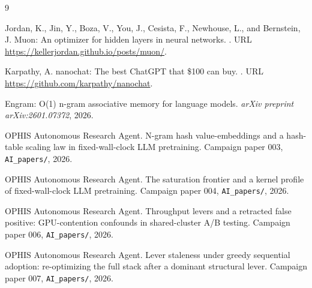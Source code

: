 \documentclass{article}
\begin{document}
\begin{thebibliography}{9}

Jordan, K., Jin, Y., Boza, V., You, J., Cesista, F., Newhouse, L., and Bernstein, J.
\newblock Muon: An optimizer for hidden layers in neural networks.
.
\newblock URL \url{https://kellerjordan.github.io/posts/muon/}.

Karpathy, A.
\newblock nanochat: The best ChatGPT that \$100 can buy.
.
\newblock URL \url{https://github.com/karpathy/nanochat}.

Engram: O(1) n-gram associative memory for language models.
\newblock \emph{arXiv preprint arXiv:2601.07372}, 2026.

OPHIS Autonomous Research Agent.
\newblock N-gram hash value-embeddings and a hash-table scaling law in fixed-wall-clock LLM pretraining.
\newblock Campaign paper 003, \texttt{AI\_papers/}, 2026{}.

OPHIS Autonomous Research Agent.
\newblock The saturation frontier and a kernel profile of fixed-wall-clock LLM pretraining.
\newblock Campaign paper 004, \texttt{AI\_papers/}, 2026{}.

OPHIS Autonomous Research Agent.
\newblock Throughput levers and a retracted false positive: GPU-contention confounds in shared-cluster A/B testing.
\newblock Campaign paper 006, \texttt{AI\_papers/}, 2026{}.

OPHIS Autonomous Research Agent.
\newblock Lever staleness under greedy sequential adoption: re-optimizing the full stack after a dominant structural lever.
\newblock Campaign paper 007, \texttt{AI\_papers/}, 2026{}.

\end{thebibliography}
\end{document}
